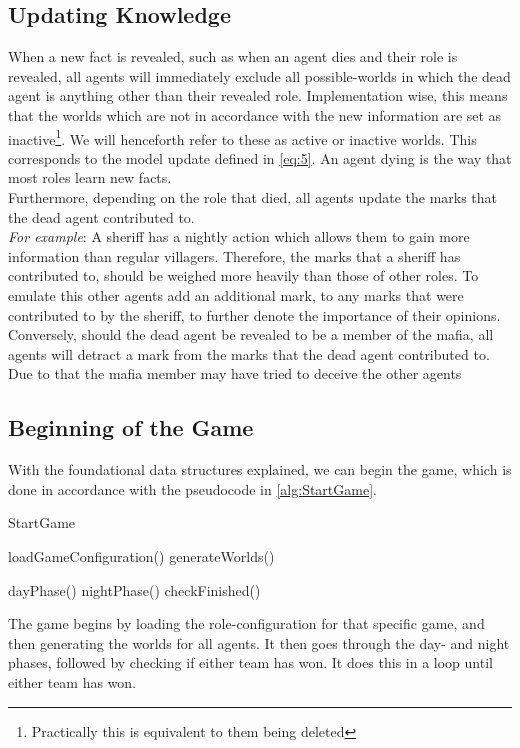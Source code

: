 \subsection{Updating Knowledge}\label{sec:UpdatingKnowledge}
When a new fact is revealed, such as when an agent dies and their role is
revealed, all agents will immediately exclude all possible-worlds in which the
dead agent is anything other than their revealed role. Implementation wise, this means
that the worlds which are not in accordance with the new information are set as inactive\footnote{Practically this is equivalent to them being deleted}. We will henceforth refer to these as active or inactive worlds. 
This corresponds to the model update defined in \cref{eq:5}. An agent dying is the way that most roles learn new facts. \\ Furthermore, depending on the role that died, all agents
update the marks that the dead agent contributed to.\\ \textit{For example}: A sheriff
has a nightly action which allows them to gain more information than regular
villagers. Therefore, the marks that a sheriff has contributed to, should be
weighed more heavily than those of other roles. To emulate this other agents
add an additional mark, to any marks that were contributed to by the sheriff,
to further denote the importance of their opinions. \\ Conversely, should the
dead agent be revealed to be a member of the mafia, all agents will detract a
mark from the marks that the dead agent contributed to. Due to that the mafia
member may have tried to deceive the other agents

\subsection{Beginning of the Game}\label{sec:beginningOfTheGame}
With the foundational data structures explained, we can begin the game, which
is done in accordance with the pseudocode in \cref{alg:StartGame}.
\begin{algorithm}[H]
	\caption{StartGame}
	\begin{algorithmic}[1]
		\State loadGameConfiguration()
		\State generateWorlds()

		\State dayPhase()
		\State nightPhase()
		\State checkFinished()
		\EndWhile
		\EndFunction
	\end{algorithmic}\label{alg:StartGame}
\end{algorithm}
\setcounter{algorithmcaption}{0}
The game begins by loading the role-configuration for that specific game, and
then generating the worlds for all agents. It then goes through the day- and
night phases, followed by checking if either team has won. It does this in a
loop until either team has won.

